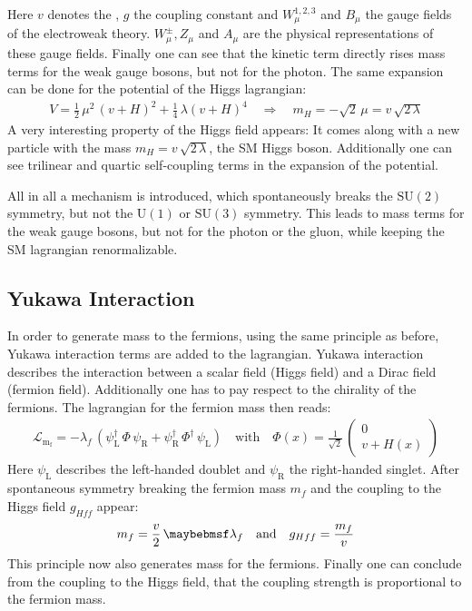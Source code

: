 Here $v$ denotes the \VEV, $g$ the coupling constant and $W^{1,2,3}_{\mu}$ and $B_{\mu}$ the gauge fields of the electroweak theory.
$W^\pm_{\mu}, Z_{\mu}$ and $A_{\mu}$ are the physical representations of these gauge fields.
Finally one can see that the kinetic term directly rises mass terms for the weak gauge bosons, but not for the photon.
The same expansion can be done for the potential of the Higgs lagrangian:
\begin{gather}
    V = \frac 1 2 \, \mu^2 \, (v+H)^2 + \frac 1 4 \, \lambda (v+H)^4 \quad \Rightarrow \quad m_H = -\sqrt 2 \, \mu = v \, \sqrt{2 \, \lambda}
\end{gather}
A very interesting property of the Higgs field appears: It comes along with a new particle with the mass $m_H =v \, \sqrt{2 \, \lambda}$, the SM Higgs boson.
Additionally one can see trilinear and quartic self-coupling terms in the expansion of the potential.

All in all a mechanism is introduced, which spontaneously breaks the $\mathrm{SU}(2)$ symmetry, but not the $\mathrm{U}(1)$ or $\mathrm{SU}(3)$ symmetry.
This leads to mass terms for the weak gauge bosons, but not for the photon or the gluon, while keeping the SM lagrangian renormalizable.

\subsection{Yukawa Interaction}

In order to generate mass to the fermions, using the same principle as before, Yukawa interaction terms are added to the lagrangian.
Yukawa interaction describes the interaction between a scalar field (Higgs field) and a Dirac field (fermion field).
Additionally one has to pay respect to the chirality of the fermions. The lagrangian for the fermion mass then reads:
\begin{gather}
    \label{eq_lagrandian_mf}
    \mathcal{L}_\mathrm{m_f}= - \lambda_f \, (\ensuremath{\psi}\xspace_\mathrm{L}^\dagger \, \Phi \, \ensuremath{\psi}\xspace_\mathrm{R}+ \ensuremath{\psi}\xspace_\mathrm{R}^\dagger \, \Phi^\dagger \, \ensuremath{\psi}\xspace_\mathrm{L}) \quad \text{with} \quad \Phi(x) = \frac{1}{\sqrt 2} \, \begin{pmatrix} 0 \\ v + H(x) \end{pmatrix}
\end{gather}
Here $\ensuremath{\psi}\xspace_\mathrm{L}$ describes the left-handed doublet and $\ensuremath{\psi}\xspace_\mathrm{R}$ the right-handed singlet.
After spontaneous symmetry breaking the fermion mass $m_f$ and the coupling to the Higgs field $g_{Hff}$ appear:
\begin{gather}
m_f = \frac{v}{2} \, \lambda_f \inote{and} g_{Hff} = \frac{m_f}{v}
\end{gather}
This principle now also generates mass for the fermions. Finally one can conclude from the coupling to the Higgs field,
that the coupling strength is proportional to the fermion mass.


